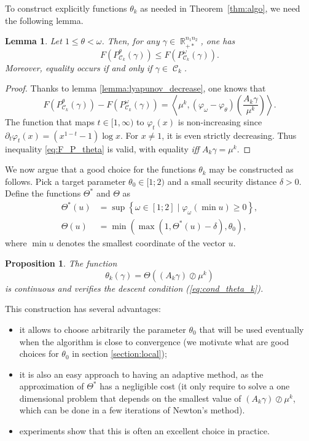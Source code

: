 \documentclass{article} %
\newcommand{\scal}[2]{\left\langle #1 , #2 \right\rangle}
\DeclareMathOperator{\IR}{\mathbb{R}}
\DeclareMathOperator{\Ccal}{\mathcal{C}}
\theoremstyle{plain}
\newtheorem{proposition}{Proposition}
\newtheorem{lemma}{Lemma}
\theoremstyle{definition}
\theoremstyle{remark}
\begin{document}

To construct explicitly functions $\theta_k$ as needed in Theorem~\ref{thm:algo}, we need the following lemma.
\begin{lemma}\label{lemma:F_P_theta}
	Let $1\le \theta < \omega$. Then, for any $\gamma \in \IR_{+*}^{n_1 n_2}$, one has
	\begin{equation}\label{eq:F_P_theta}
	F(P^\theta_{\Ccal_k}(\gamma)) \le F(P^\omega_{\Ccal_k}(\gamma)).
	\end{equation}
	Moreover, equality occurs if and only if $\gamma \in \Ccal_k$.
\end{lemma}
\begin{proof}
	Thanks to lemma \ref{lemma:lyapunov_decrease}, one knows that
	\[
	F(P^\theta_{\Ccal_k}(\gamma)) - F(P^\omega_{\Ccal_k}(\gamma))
	= \scal{\mu^k}{(\varphi_\omega - \varphi_\theta) \left( \frac{A_k \gamma}{\mu^k} \right) } .
	\]
	The function that maps $t \in [1,\infty)$ to $\varphi_t(x)$ is non-increasing since
	$\partial_t \varphi_t(x) =  (x^{1-t} - 1)\log x.$
	For $x\neq 1$, it is even strictly decreasing.
	Thus inequality \eqref{eq:F_P_theta} is valid, with equality \emph{iff} $A_k \gamma = \mu^k$.
\end{proof}

We now argue that a good choice for the functions $\theta_k$ may be constructed as follows. Pick a target parameter $\theta_0 \in [1;2)$ and a small security distance $\delta>0$. Define the functions $\Theta^*$ and $\Theta$ as
	\begin{align}
	\label{eq:Theta_opt}
	\Theta^*(u) &= \sup \left\{\omega \in [1;2]  \mid \varphi_\omega\left(\min u\right) \ge 0 \right\} ,\\
	\label{eq:Theta}
	\Theta(u) &= \min(\max(1,\Theta^*(u)-\delta),\theta_0),
	\end{align}
	where $\min u$ denotes the smallest coordinate of the vector $u$. 

\begin{proposition}\label{prop:thetachoice}
	The function
	\begin{equation}
	\label{eq:theta_k}
	\theta_k(\gamma) =\Theta\left ((A_k \gamma)\oslash \mu^k\right)
	\end{equation}
	is continuous and verifies the descent condition (\ref{eq:cond_theta_k}).
\end{proposition}
This construction has several advantages:
\begin{itemize}
\item it allows to choose arbitrarily the parameter $\theta_0$ that will be used eventually when the algorithm is close to convergence (we motivate what are good choices for $\theta_0$ in section \ref{section:local});
\item it is also an easy approach to having an adaptive method, as the approximation of $\Theta^*$ has a negligible cost (it only require to solve a one dimensional problem that depends on the smallest value of $(A_k \gamma)\oslash \mu^k$, which can be done in a few iterations of Newton's method).
\item experiments show that this is often an excellent choice in practice.
\end{itemize}
\end{document}
